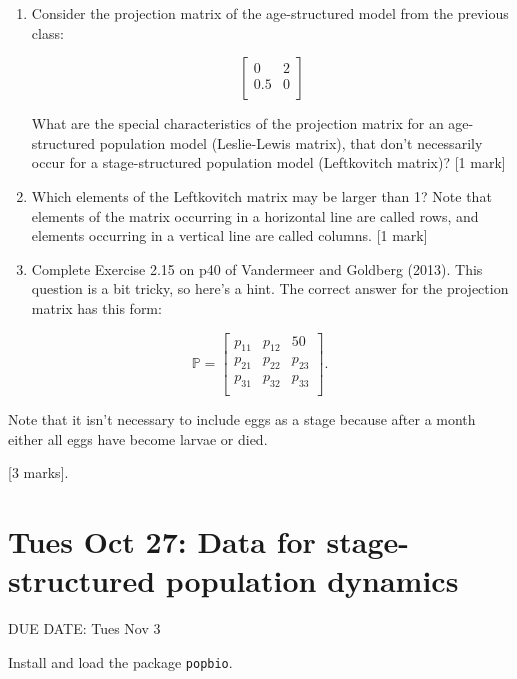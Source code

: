 \documentclass[]{book}
\begin{document}
\begin{enumerate}
\def\labelenumi{\arabic{enumi}.}
\item
  Consider the projection matrix of the age-structured model from the
  previous class:

  \begin{equation}
  \left[
  \begin{array}{cc}
  0 & 2\\
  0.5 & 0\\
  \end{array}
  \right]
  \end{equation}

  What are the special characteristics of the projection matrix for an
  age-structured population model (Leslie-Lewis matrix), that don't
  necessarily occur for a stage-structured population model (Leftkovitch
  matrix)? {[}1 mark{]}
\item
  Which elements of the Leftkovitch matrix may be larger than 1? Note
  that elements of the matrix occurring in a horizontal line are called
  rows, and elements occurring in a vertical line are called columns.
  {[}1 mark{]}
\item
  Complete Exercise 2.15 on p40 of Vandermeer and Goldberg (2013). This
  question is a bit tricky, so here's a hint. The correct answer for the
  projection matrix has this form:
\end{enumerate}

\begin{equation}
\mathbb{P} = 
\left[
\begin{array}{ccc}
p_{11} & p_{12} & 50 \\
p_{21} & p_{22} & p_{23}\\
p_{31} & p_{32} & p_{33}\\
\end{array}
\right].
\end{equation}

Note that it isn't necessary to include eggs as a stage because after a
month either all eggs have become larvae or died.

{[}3 marks{]}.

\chapter{Tues Oct 27: Data for stage-structured population
dynamics}\label{tues-oct-27-data-for-stage-structured-population-dynamics}

DUE DATE: Tues Nov 3

Install and load the package \texttt{popbio}.
\end{document}
